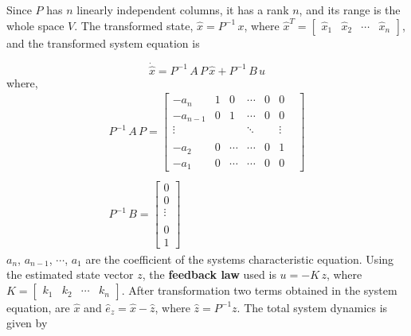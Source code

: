 \documentclass{elsarticle}
\numberwithin{equation}{section}
\begin{document}
Since $P$ has $n$ linearly independent columns, it has a rank $n$, and its range is the whole space\cite{KALMAN1960491} $V$. The transformed state, $\widehat{x}=P^{-1}\,x$, where $\widehat{x}^T=\begin{bmatrix} \widehat{x}_1 & \widehat{x}_2 & \cdots& \widehat{x}_n\end{bmatrix}$, and the transformed system equation is 

\begin{equation}
	\dot{\widehat{x}}=P^{-1}\,A\,P\,\widehat{x}+P^{-1}\,B\,u
\end{equation}
 where,
\begin{equation}\label{controllersingle}
	\begin{split}
	{
	P^{-1}\,A\,P= \begin{bmatrix}
   	-a_n & 1 & 0 &\cdots& 0 & 0 \\
	-a_{n-1} & 0 & 1 &\cdots& 0 & 0 \\
	\vdots& & &\ddots&   &\vdots& \\
	\\
	-a_2 & 0 &\cdots&\cdots& 0 & 1 \\
	-a_1& 0 &\cdots&\cdots& 0 & 0
	\end{bmatrix}
	}
	\hspace{0cm} \\ \\
	{
	P^{-1}\,B= \begin{bmatrix}
   	0\\
	0\\
	\vdots\\
	\\
	0\\
	1
	\end{bmatrix}
	}
	\end{split}
\end{equation}
$a_{n}$, $a_{n-1}$, $\cdots$, $a_1$ are the coefficient of the systems characteristic equation. Using the estimated state vector $z$, the \textbf{feedback law} used is $u=-K\,z$, where $K=\begin{bmatrix}
k_1 &  k_2 &\cdots& k_n \end{bmatrix}$. After transformation two terms obtained in the system equation, are $\widehat{x}$ and $\widehat{e}_z = \widehat{x}- \widehat{z}$, where $\widehat{z}=P^{-1}z$. The total system dynamics is given by
\end{document}
